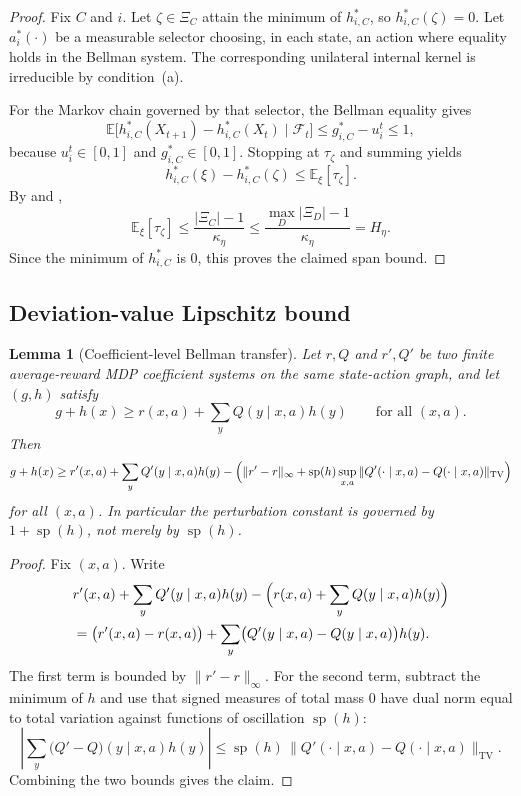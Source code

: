 \documentclass[12pt]{article}
\newtheorem{lemma}[theorem]{Lemma}
\theoremstyle{definition}
\newcommand{\E}{\mathbb{E}}
\newcommand{\1}{\mathbf{1}}
\newcommand{\cF}{\mathcal{F}}
\DeclareMathOperator{\spn}{sp}
\begin{document}
\begin{proof}
Fix $C$ and $i$.  Let $\zeta\in\Xi_C$ attain the minimum of $h_{i,C}^*$, so
$h_{i,C}^*(\zeta)=0$.  Let $a_i^*(\cdot)$ be a measurable selector choosing, in
each state, an action where equality holds in the Bellman system.  The corresponding
unilateral internal kernel is irreducible by condition~\textnormal{(a)}.

For the Markov chain governed by that selector, the Bellman equality gives
\[
\E\bigl[h_{i,C}^*(X_{t+1})-h_{i,C}^*(X_t)\mid \cF_t\bigr]
\le g_{i,C}^*-u_i^t
\le 1,
\]
because $u_i^t\in[0,1]$ and $g_{i,C}^*\in[0,1]$.  Stopping at $\tau_\zeta$ and
summing yields
\[
h_{i,C}^*(\xi)-h_{i,C}^*(\zeta)\le \E_\xi[\tau_\zeta].
\]
By  and ,
\[
\E_\xi[\tau_\zeta]\le \frac{|\Xi_C|-1}{\kappa_\eta}
\le \frac{\max_D|\Xi_D|-1}{\kappa_\eta}=H_\eta.
\]
Since the minimum of $h_{i,C}^*$ is $0$, this proves the claimed span bound.
\end{proof}

\subsection{Deviation-value Lipschitz bound}

\begin{lemma}[Coefficient-level Bellman transfer]
\label{lem:coefficient-transfer}
Let $r,Q$ and $r',Q'$ be two finite average-reward MDP coefficient systems on the
same state-action graph, and let $(g,h)$ satisfy
\[
g+h(x)\ge r(x,a)+\sum_y Q(y\mid x,a)h(y)
\qquad\text{for all }(x,a).
\]
Then
\[
g+h(x)
\ge
r'(x,a)+\sum_y Q'(y\mid x,a)h(y)
-\Bigl(\|r'-r\|_\infty + \spn(h)\sup_{x,a}\|Q'(\cdot\mid x,a)-Q(\cdot\mid x,a)\|_{\mathrm{TV}}\Bigr)
\]
for all $(x,a)$.  In particular the perturbation constant is governed by
$1+\spn(h)$, not merely by $\spn(h)$.
\end{lemma}

\begin{proof}
Fix $(x,a)$.  Write
\begin{align*}
&r'(x,a)+\sum_y Q'(y\mid x,a)h(y)
-
\Bigl(r(x,a)+\sum_y Q(y\mid x,a)h(y)\Bigr)
\\
&= \bigl(r'(x,a)-r(x,a)\bigr)
+
\sum_y\bigl(Q'(y\mid x,a)-Q(y\mid x,a)\bigr)h(y).
\end{align*}
The first term is bounded by $\|r'-r\|_\infty$.  For the second term, subtract the
minimum of $h$ and use that signed measures of total mass $0$ have dual norm equal
to total variation against functions of oscillation $\spn(h)$:
\[
\left|\sum_y\bigl(Q'-Q\bigr)(y\mid x,a)h(y)\right|
\le
\spn(h)\,\|Q'(\cdot\mid x,a)-Q(\cdot\mid x,a)\|_{\mathrm{TV}}.
\]
Combining the two bounds gives the claim.
\end{proof}
\end{document}
